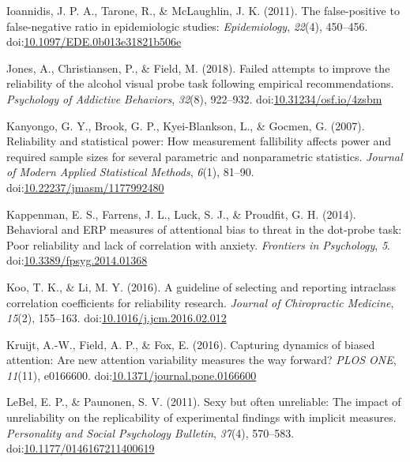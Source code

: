 \documentclass[english,,man,floatsintext]{apa6}
\begin{document}
\leavevmode\hypertarget{ref-ioannidis_false-positive_2011}{}%
Ioannidis, J. P. A., Tarone, R., \& McLaughlin, J. K. (2011). The false-positive to false-negative ratio in epidemiologic studies: \emph{Epidemiology}, \emph{22}(4), 450--456. doi:\href{https://doi.org/10.1097/EDE.0b013e31821b506e}{10.1097/EDE.0b013e31821b506e}

\leavevmode\hypertarget{ref-jones_failed_2018}{}%
Jones, A., Christiansen, P., \& Field, M. (2018). Failed attempts to improve the reliability of the alcohol visual probe task following empirical recommendations. \emph{Psychology of Addictive Behaviors}, \emph{32}(8), 922--932. doi:\href{https://doi.org/10.31234/osf.io/4zsbm}{10.31234/osf.io/4zsbm}

\leavevmode\hypertarget{ref-kanyongo_reliability_2007}{}%
Kanyongo, G. Y., Brook, G. P., Kyei-Blankson, L., \& Gocmen, G. (2007). Reliability and statistical power: How measurement fallibility affects power and required sample sizes for several parametric and nonparametric statistics. \emph{Journal of Modern Applied Statistical Methods}, \emph{6}(1), 81--90. doi:\href{https://doi.org/10.22237/jmasm/1177992480}{10.22237/jmasm/1177992480}

\leavevmode\hypertarget{ref-kappenman_behavioral_2014}{}%
Kappenman, E. S., Farrens, J. L., Luck, S. J., \& Proudfit, G. H. (2014). Behavioral and ERP measures of attentional bias to threat in the dot-probe task: Poor reliability and lack of correlation with anxiety. \emph{Frontiers in Psychology}, \emph{5}. doi:\href{https://doi.org/10.3389/fpsyg.2014.01368}{10.3389/fpsyg.2014.01368}

\leavevmode\hypertarget{ref-koo_guideline_2016}{}%
Koo, T. K., \& Li, M. Y. (2016). A guideline of selecting and reporting intraclass correlation coefficients for reliability research. \emph{Journal of Chiropractic Medicine}, \emph{15}(2), 155--163. doi:\href{https://doi.org/10.1016/j.jcm.2016.02.012}{10.1016/j.jcm.2016.02.012}

\leavevmode\hypertarget{ref-kruijt_capturing_2016}{}%
Kruijt, A.-W., Field, A. P., \& Fox, E. (2016). Capturing dynamics of biased attention: Are new attention variability measures the way forward? \emph{PLOS ONE}, \emph{11}(11), e0166600. doi:\href{https://doi.org/10.1371/journal.pone.0166600}{10.1371/journal.pone.0166600}

\leavevmode\hypertarget{ref-lebel_sexy_2011}{}%
LeBel, E. P., \& Paunonen, S. V. (2011). Sexy but often unreliable: The impact of unreliability on the replicability of experimental findings with implicit measures. \emph{Personality and Social Psychology Bulletin}, \emph{37}(4), 570--583. doi:\href{https://doi.org/10.1177/0146167211400619}{10.1177/0146167211400619}
\end{document}
